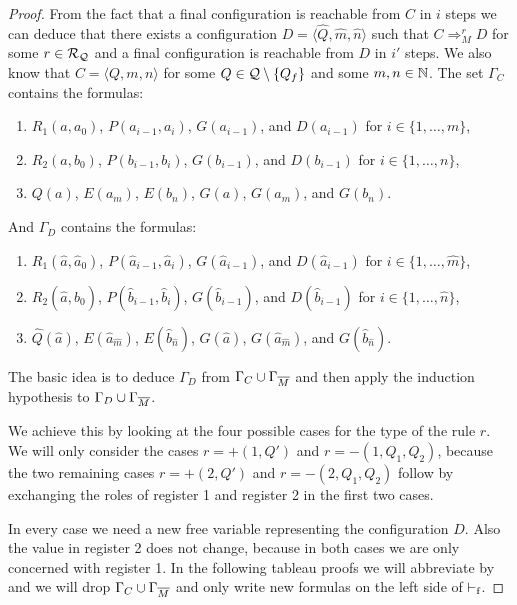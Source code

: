 \begin{proof}
	From the fact that a final configuration is reachable from $C$ in $i$ steps we can deduce that there exists a configuration $D=\langle \widehat{Q}, \widehat{m}, \widehat{n}\rangle$ such that $C\Rightarrow_M^r D$ for some $r\in\mathcal{R}_{\mathcal{Q}}$ and a final configuration is reachable from $D$ in $i'$ steps. We also know that $C=\langle Q,m,n\rangle$ for some $Q\in\mathcal{Q}\setminus\{Q_f\}$ and some $m,n\in\mathbb{N}$.
	The set $\Gamma_C$ contains the formulas: 
	\begin{enumerate}[label=]%
		\item $R_1(a,a_0)$, $P(a_{i-1},a_i)$, $G(a_{i-1})$, and $D(a_{i-1})$ for $i\in\{1,\dots,m\}$,
		\item $R_2(a,b_0)$, $P(b_{i-1},b_i)$, $G(b_{i-1})$, and $D(b_{i-1})$ for $i\in\{1,\dots,n\}$,
		\item $Q(a)$, $E(a_m)$, $E(b_n)$, $G(a)$, $G(a_m)$, and $G(b_n)$.
	\end{enumerate}
	And $\Gamma_D$ contains the formulas:
	\begin{enumerate}[label=]
		\item $R_1(\widehat{a},\widehat{a}_0)$, $P(\widehat{a}_{i-1},\widehat{a}_i)$, $G(\widehat{a}_{i-1})$, and $D(\widehat{a}_{i-1})$ for $i\in\{1,\dots,\widehat{m}\}$,
		\item $R_2(\widehat{a},\widehat{b}_0)$, $P(\widehat{b}_{i-1},\widehat{b}_i)$, $G(\widehat{b}_{i-1})$, and $D(\widehat{b}_{i-1})$ for $i\in\{1,\dots,\widehat{n}\}$,
		\item $\widehat{Q}(\widehat{a})$, $E({\widehat{a}}_{\widehat{m}})$, $E({\widehat{b}}_{\widehat{n}})$, $G(\widehat{a})$, $G({\widehat{a}}_{\widehat{m}})$, and $G({\widehat{b}}_{\widehat{n}})$.
	\end{enumerate}
	The basic idea is to deduce $\Gamma_D$ from $\Gamma_C\cup\Gamma_{\overline{M}}$ and then apply the induction hypothesis to $\Gamma_D\cup\Gamma_{\overline{M}}$. 
	
	\begin{figure}[H]
		\centering
		
	\end{figure}
	
	We achieve this by looking at the four possible cases for the type of the rule $r$. We will only consider the cases $r=+(1,Q')$ and $r=-(1,Q_1,Q_2)$, because the two remaining cases $r=+(2,Q')$ and $r=-(2,Q_1,Q_2)$ follow by exchanging the roles of register 1 and register 2 in the first two cases.
	
	In every case we need a new free variable representing the configuration $D$. Also the value in register 2 does not change, because in both cases we are only concerned with register 1.
	In the following tableau proofs we will abbreviate \false{} by \falses{} and we will drop $\Gamma_C\cup\Gamma_{\overline{M}}$ and only write new formulas on the left side of $\vdash_\text{f}$.
	

\end{proof}
